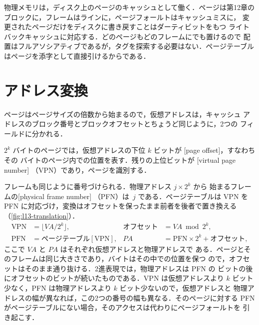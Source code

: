 \documentclass[../main.tex]{subfiles}
\begin{document}
\begin{note}
  物理メモリは，ディスク上のページのキャッシュとして働く．ページは第12章の
  ブロックに，フレームはラインに，ページフォールトはキャッシュミスに，
  変更されたページだけをディスクに書き戻すことはダーティビットをもつ
  ライトバックキャッシュに対応する．どのページもどのフレームにでも置けるので
  配置はフルアソシアティブであるが，タグを探索する必要はない．ページテーブル
  はページを添字として直接引けるからである．
\end{note}

\section{アドレス変換}
\label{sec:l13-translation}

ページはページサイズの倍数から始まるので，仮想アドレスは，キャッシュ
アドレスのブロック番号とブロックオフセットとちょうど同じように，2つの
フィールドに分かれる．

\begin{definition}[仮想ページ番号とページオフセット]
  $2^{k}$ バイトのページでは，仮想アドレスの下位 $k$ ビットが
  [page offset]，すなわちその
  バイトのページ内での位置を表す．残りの上位ビットが
  [virtual page number]%
  （VPN）であり，ページを識別する．
\end{definition}

フレームも同じように番号づけられる．物理アドレス $j \times 2^{k}$ から
始まるフレームの[physical frame number]%
（PFN）は~$j$ である．ページテーブルは VPN を
PFN に対応づけ，変換はオフセットを保ったまま前者を後者で置き換える
（\cref{fig:l13-translation}）．
\begin{equation}
  \begin{aligned}
    \text{VPN} &= \bigl\lfloor \mathit{VA} / 2^{k} \bigr\rfloor , &
    \text{オフセット} &= \mathit{VA} \bmod 2^{k} , \\
    \text{PFN} &= \text{ページテーブル}[\text{VPN}] , &
    \mathit{PA} &= \text{PFN} \times 2^{k} + \text{オフセット} ,
  \end{aligned}
  \label{eq:l13-translation}
\end{equation}
ここで $\mathit{VA}$ と $\mathit{PA}$ はそれぞれ仮想アドレスと物理アドレスで
ある．ページとそのフレームは同じ大きさであり，バイトはその中での位置を保つ
ので，オフセットはそのまま通り抜ける．2進表現では，物理アドレスは PFN の
ビットの後にオフセットのビットが続いたものである．VPN は仮想アドレスより
$k$ ビット少なく，PFN は物理アドレスより $k$ ビット少ないので，仮想アドレスと
物理アドレスの幅が異なれば，この2つの番号の幅も異なる．そのページに対する
PFN がページテーブルにない場合，そのアクセスは代わりにページフォールトを
引き起こす．
\end{document}
